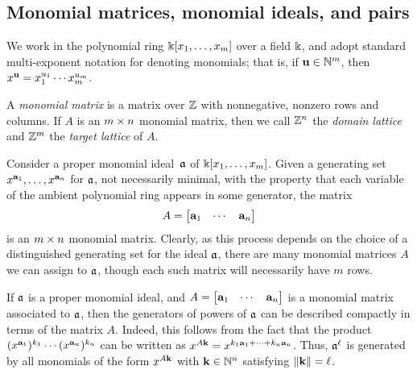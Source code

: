 \documentclass{amsart}
\begin{document}
\subsection{Monomial matrices, monomial ideals, and pairs}
\label{monomial newton preliminaries: ss}

We work in the polynomial ring $\Bbbk[x_1, \ldots, x_m]$ over a field $\Bbbk$, and adopt standard multi-exponent notation for denoting monomials; that is, if $\mathbf{u} \in \mathbb{N}^m$, then $x^{\mathbf{u}} = x_1^{u_1} \cdots x_m^{u_m}$.

\begin{definition}
\label{monomial matrix: D}
A \emph{monomial matrix} is a matrix over $\mathbb{Z}$ with nonnegative, nonzero rows and columns.
If $A$ is an $m \times n$ monomial matrix, then we call $\mathbb{Z}^n$ the \emph{domain lattice} and $\mathbb{Z}^m$ the \emph{target lattice} of $A$.
\end{definition}

\begin{remark}
   \label{monomial matrix ideal: R}
   Consider a proper monomial ideal~$\mathfrak{a}$ of $\Bbbk[x_1, \ldots, x_{m}]$.
   Given a generating set $x^{\mathbf{a}_1}, \ldots, x^{\mathbf{a}_n}$ for $\mathfrak{a}$, not necessarily minimal, with the property that each variable of the ambient polynomial ring appears in some generator, the matrix
   \[
      A= \begin{bmatrix} \mathbf{a}_1 & \cdots & \mathbf{a}_n \end{bmatrix}
   \]
   is an  $m \times n$ monomial matrix.
   Clearly, as this process depends on the choice of a distinguished generating set for the ideal $\mathfrak{a}$, there are many monomial matrices $A$ we can assign to $\mathfrak{a}$, though each such matrix will necessarily have $m$ rows.
\end{remark}

\begin{remark}
   \label{generators-via-exponent-matrix: R}
   If $\mathfrak{a}$ is a proper monomial ideal, and $A= \begin{bmatrix} \mathbf{a}_1 & \cdots & \mathbf{a}_n \end{bmatrix}$ is a monomial matrix associated to $\mathfrak{a}$, then the generators of powers of $\mathfrak{a}$ can be described compactly in terms of the matrix $A$.
   Indeed, this follows from the fact that the product $(x^{\mathbf{a}_1})^{k_1} \cdots (x^{\mathbf{a}_n})^{k_n}$ can be written as $x^{A \mathbf{k}} = x^{k_1 \mathbf{a}_1 + \cdots + k_n \mathbf{a}_n}$.
   Thus, $\mathfrak{a}^\ell$ is generated by all monomials of the form $x^{A \mathbf{k}}$ with $\mathbf{k} \in \mathbb{N}^n$ satisfying $\| \mathbf{k} \| = \ell$.
\end{remark}
\end{document}
